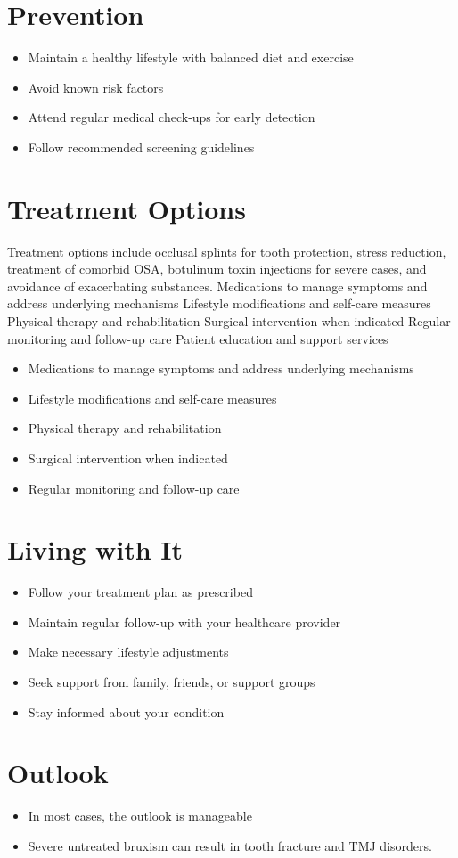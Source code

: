 \section{Prevention}
\begin{itemize}[noitemsep]
  \item Maintain a healthy lifestyle with balanced diet and exercise
  \item Avoid known risk factors
  \item Attend regular medical check-ups for early detection
  \item Follow recommended screening guidelines
\end{itemize}
\section{Treatment Options}
Treatment options include occlusal splints for tooth protection, stress reduction, treatment of comorbid OSA, botulinum toxin injections for severe cases, and avoidance of exacerbating substances. Medications to manage symptoms and address underlying mechanisms Lifestyle modifications and self-care measures Physical therapy and rehabilitation Surgical intervention when indicated Regular monitoring and follow-up care Patient education and support services

\begin{itemize}[noitemsep]
  \item Medications to manage symptoms and address underlying mechanisms
  \item Lifestyle modifications and self-care measures
  \item Physical therapy and rehabilitation
  \item Surgical intervention when indicated
  \item Regular monitoring and follow-up care
\end{itemize}
\section{Living with It}
\begin{itemize}[noitemsep]
  \item Follow your treatment plan as prescribed
  \item Maintain regular follow-up with your healthcare provider
  \item Make necessary lifestyle adjustments
  \item Seek support from family, friends, or support groups
  \item Stay informed about your condition
\end{itemize}
\section{Outlook}
\begin{itemize}[noitemsep]
  \item In most cases, the outlook is manageable
  \item Severe untreated bruxism can result in tooth fracture and TMJ disorders.
\end{itemize}
